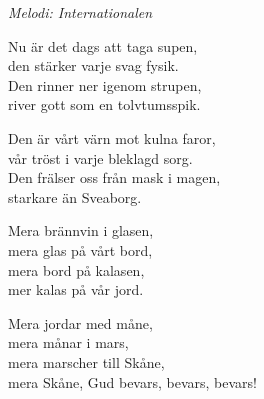{\footnotesize\textit{Melodi: Internationalen}}\par
\vspace{10pt}
Nu är det dags att taga supen,\\
den stärker varje svag fysik.\\
Den rinner ner igenom strupen,\\
river gott som en tolvtumsspik.\par
\vspace{10pt}
Den är vårt värn mot kulna faror,\\
vår tröst i varje bleklagd sorg.\\
Den frälser oss från mask i magen,\\
starkare än Sveaborg.\par
\vspace{10pt}
Mera brännvin i glasen,\\
mera glas på vårt bord,\\
mera bord på kalasen,\\
mer kalas på vår jord.\par
\vspace{10pt}
Mera jordar med måne,\\
mera månar i mars,\\
mera marscher till Skåne,\\
mera Skåne, Gud bevars, bevars, bevars!
